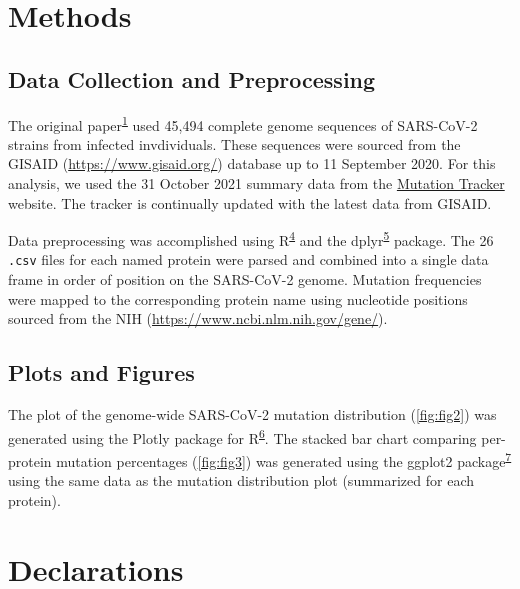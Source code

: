 \documentclass{article}
\begin{document}
\hypertarget{methods}{%
\section{Methods}\label{methods}}

\hypertarget{data-collection-and-preprocessing}{%
\subsection{Data Collection and
Preprocessing}\label{data-collection-and-preprocessing}}

The original paper\textsuperscript{\protect\hyperlink{ref-Wang2021}{1}}
used 45,494 complete genome sequences of SARS-CoV-2 strains from
infected invdividuals. These sequences were sourced from the GISAID
(\url{https://www.gisaid.org/}) database up to 11 September 2020. For
this analysis, we used the 31 October 2021 summary data from the
\href{https://users.math.msu.edu/users/weig/SARS-CoV-2_Mutation_Tracker.html}{Mutation
Tracker} website. The tracker is continually updated with the latest
data from GISAID.

Data preprocessing was accomplished using
R\textsuperscript{\protect\hyperlink{ref-R-base}{4}} and the
dplyr\textsuperscript{\protect\hyperlink{ref-R-dplyr}{5}} package. The
26 \texttt{.csv} files for each named protein were parsed and combined
into a single data frame in order of position on the SARS-CoV-2 genome.
Mutation frequencies were mapped to the corresponding protein name using
nucleotide positions sourced from the NIH
(\url{https://www.ncbi.nlm.nih.gov/gene/}).

\hypertarget{plots-and-figures}{%
\subsection{Plots and Figures}\label{plots-and-figures}}

The plot of the genome-wide SARS-CoV-2 mutation distribution
(\autoref{fig:fig2}) was generated using the Plotly package for
R\textsuperscript{\protect\hyperlink{ref-R-plotly}{6}}. The stacked bar
chart comparing per-protein mutation percentages (\autoref{fig:fig3})
was generated using the ggplot2
package\textsuperscript{\protect\hyperlink{ref-R-ggplot2}{7}} using the
same data as the mutation distribution plot (summarized for each
protein).

\hypertarget{declarations}{%
\section*{Declarations}\label{declarations}}
\end{document}
